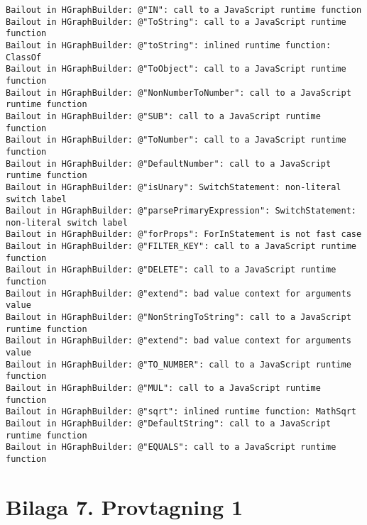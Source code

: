 \begin{verbatim}
Bailout in HGraphBuilder: @"IN": call to a JavaScript runtime function
Bailout in HGraphBuilder: @"ToString": call to a JavaScript runtime function
Bailout in HGraphBuilder: @"toString": inlined runtime function: ClassOf
Bailout in HGraphBuilder: @"ToObject": call to a JavaScript runtime function
Bailout in HGraphBuilder: @"NonNumberToNumber": call to a JavaScript runtime function
Bailout in HGraphBuilder: @"SUB": call to a JavaScript runtime function
Bailout in HGraphBuilder: @"ToNumber": call to a JavaScript runtime function
Bailout in HGraphBuilder: @"DefaultNumber": call to a JavaScript runtime function
Bailout in HGraphBuilder: @"isUnary": SwitchStatement: non-literal switch label
Bailout in HGraphBuilder: @"parsePrimaryExpression": SwitchStatement: non-literal switch label
Bailout in HGraphBuilder: @"forProps": ForInStatement is not fast case
Bailout in HGraphBuilder: @"FILTER_KEY": call to a JavaScript runtime function
Bailout in HGraphBuilder: @"DELETE": call to a JavaScript runtime function
Bailout in HGraphBuilder: @"extend": bad value context for arguments value
Bailout in HGraphBuilder: @"NonStringToString": call to a JavaScript runtime function
Bailout in HGraphBuilder: @"extend": bad value context for arguments value
Bailout in HGraphBuilder: @"TO_NUMBER": call to a JavaScript runtime function
Bailout in HGraphBuilder: @"MUL": call to a JavaScript runtime function
Bailout in HGraphBuilder: @"sqrt": inlined runtime function: MathSqrt
Bailout in HGraphBuilder: @"DefaultString": call to a JavaScript runtime function
Bailout in HGraphBuilder: @"EQUALS": call to a JavaScript runtime function
\end{verbatim}

\clearpage
{}
\section*{Bilaga 7. Provtagning 1}

